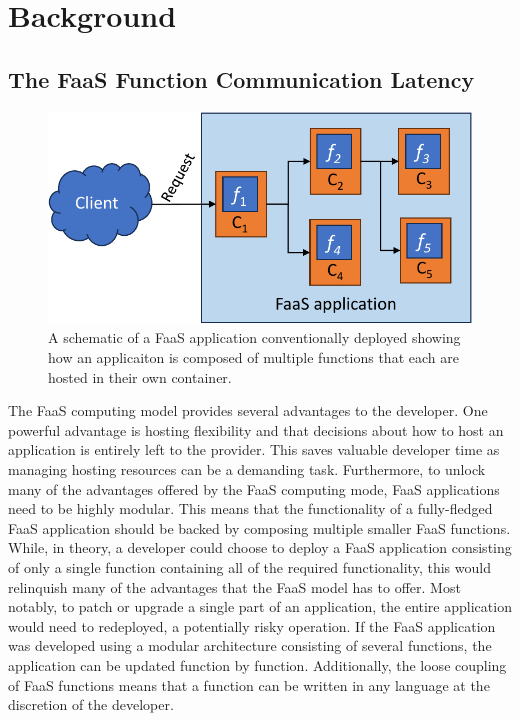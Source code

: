 \section{Background}

\subsection{The FaaS Function Communication Latency}
\label{subsec:faas-apps}

\begin{figure}
  \centering
  \includegraphics[width=\columnwidth]{figures/faas_application}
  \caption{\label{fig:faas-app} A schematic of a FaaS application conventionally deployed showing how an applicaiton is composed of multiple functions that each are hosted in their own container.}
\end{figure}

The FaaS computing model provides several advantages to the developer. One powerful advantage is hosting flexibility and that decisions about how to host an application is entirely left to the provider. This saves valuable developer time as managing hosting resources can be a demanding task. Furthermore, to unlock many of the advantages offered by the FaaS computing mode, FaaS applications need to be highly modular. This means that the functionality of a fully-fledged FaaS application should be backed by composing multiple smaller FaaS functions. While, in theory, a developer could choose to deploy a FaaS application consisting of only a single function containing all of the required functionality, this would relinquish many of the advantages that the FaaS model has to offer. Most notably, to patch or upgrade a single part of an application, the entire application would need to redeployed, a potentially risky operation. If the FaaS application was developed using a modular architecture consisting of several functions, the application can be updated function by function. Additionally, the loose coupling of FaaS functions means that a function can be written in any language at the discretion of the developer.

